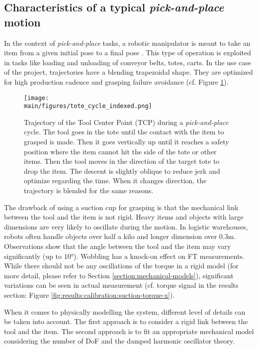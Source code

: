 \documentclass[/home/francois/latex/report/main.tex]{subfiles}
\begin{document}
\subsection{Characteristics of a typical \textit{pick-and-place} motion}
\label{background:motion}

In the context of \textit{pick-and-place} tasks, a robotic manipulator is meant to
take an item from a given initial pose to a final pose \cite{Angeles2006}. This type of operation is exploited in tasks like loading and unloading of conveyor belts, totes, carts. In the use case of the project, trajectories have a blending trapezoidal shape. They are optimized for high production cadence and grasping failure avoidance (cf. Figure \ref{fig:background:tote_cycle}).

\begin{figure}[h]
  \centering
  \texttt{[image: \\main/figures/tote\_cycle\_indexed.png]}
  \caption{Trajectory of the Tool Center Point (TCP) during a \textit{pick-and-place} cycle. The tool goes in the tote until the contact with the item to grasped is made. Then it goes vertically up until it reaches a safety position where the item cannot hit the side of the tote or other items. Then the tool moves in the direction of the target tote to drop the item. The descent is slightly oblique to reduce jerk and optimize regarding the time. When it changes direction, the trajectory is blended for the same reasons.}
  \label{fig:background:tote_cycle}
\end{figure}

The drawback of using a suction cup for grasping is that the mechanical link between the tool and the item is not rigid. Heavy items and objects with large dimensions are very likely to oscillate during the motion. In logistic warehouses, robots often handle objects over half a kilo and longer dimension over $0.3 \si{\meter}$. Observations show that the angle between the tool and the item may vary significantly (up to $10 \si{\degree}$). Wobbling has a knock-on effect on \ac{FT} measurements. While there should not be any oscillations of the torque in a rigid model (for more detail, please refer to Section \ref{section:mechanical-models}), significant variations can be seen in actual measurement (cf. torque signal in the results section:   Figure \ref{fig:results:calibration:suction-torque-x}).

When it comes to physically modelling the system, different level of details can be taken into account. The first approach is to consider a rigid link between the tool and the item. The second approach is to fit an appropriate mechanical model considering the number of \ac{DoF} and the damped harmonic oscillator theory.
\end{document}
